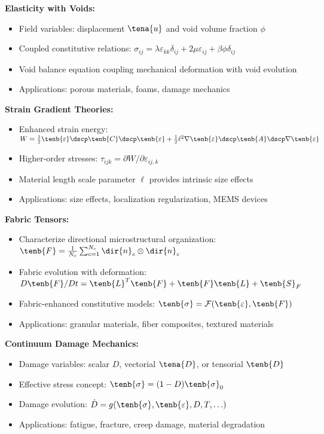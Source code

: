 \begin{subox}[Summary]
\textbf{Elasticity with Voids:}
\begin{itemize}
\item Field variables: displacement $\tena{u}$ and void volume fraction $\phi$
\item Coupled constitutive relations: $\sigma_{ij} = \lambda \varepsilon_{kk} \delta_{ij} + 2\mu \varepsilon_{ij} + \beta \phi \delta_{ij}$
\item Void balance equation coupling mechanical deformation with void evolution
\item Applications: porous materials, foams, damage mechanics
\end{itemize}

\textbf{Strain Gradient Theories:}
\begin{itemize}
\item Enhanced strain energy: $W = \frac{1}{2} \tenb{\varepsilon} \dscp \tenb{C} \dscp \tenb{\varepsilon} + \frac{1}{2} \ell^2 \nabla \tenb{\varepsilon} \dscp \tenb{A} \dscp \nabla \tenb{\varepsilon}$
\item Higher-order stresses: $\tau_{ijk} = \partial W/\partial \varepsilon_{ij,k}$
\item Material length scale parameter $\ell$ provides intrinsic size effects
\item Applications: size effects, localization regularization, MEMS devices
\end{itemize}

\textbf{Fabric Tensors:}
\begin{itemize}
\item Characterize directional microstructural organization: $\tenb{F} = \frac{1}{N_c} \sum_{c=1}^{N_c} \dir{n}_c \otimes \dir{n}_c$
\item Fabric evolution with deformation: $D\tenb{F}/Dt = \tenb{L}^T \tenb{F} + \tenb{F} \tenb{L} + \tenb{S}_F$
\item Fabric-enhanced constitutive models: $\tenb{\sigma} = \mathcal{F}(\tenb{\varepsilon}, \tenb{F})$
\item Applications: granular materials, fiber composites, textured materials
\end{itemize}

\textbf{Continuum Damage Mechanics:}
\begin{itemize}
\item Damage variables: scalar $D$, vectorial $\tena{D}$, or tensorial $\tenb{D}$
\item Effective stress concept: $\tenb{\sigma} = (1-D) \tenb{\sigma}_0$
\item Damage evolution: $\dot{D} = g(\tenb{\sigma}, \tenb{\varepsilon}, D, T, \ldots)$
\item Applications: fatigue, fracture, creep damage, material degradation
\end{itemize}


\end{subox}
